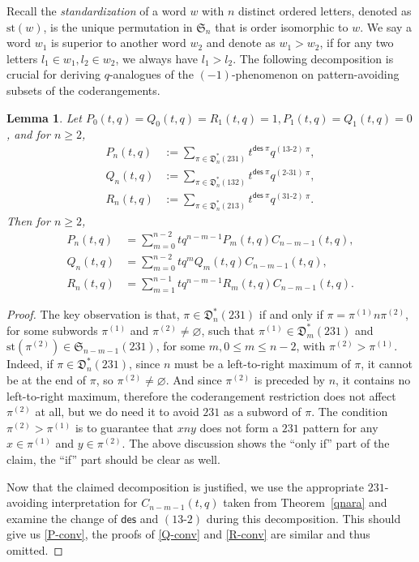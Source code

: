 \documentclass[12pt,reqno]{amsart}
\numberwithin{equation}{section}
\theoremstyle{plain}
\newtheorem{lemma}[theorem]{Lemma}
\theoremstyle{definition}
\def\S{\mathfrak{S}}
\def\D{\mathfrak{D}}
\def\des{\mathsf{des}}
\def\cab{31\text{-}2}
\def\bca{2\text{-}31}
\def\acb{13\text{-}2}
\def\st{\textrm{st}}
\begin{document}
Recall the {\em standardization} of a word $w$ with $n$ distinct ordered letters, denoted as $\st(w)$, is the unique permutation in $\S_n$ that is order isomorphic to $w$. We say a word $w_1$ is superior to another word $w_2$ and denote as $w_1>w_2$, if for any two letters $l_1\in w_1, l_2\in w_2$, we always have $l_1>l_2$. The following decomposition is crucial for deriving $q$-analogues of the $(-1)$-phenomenon on pattern-avoiding subsets of the coderangements.
\begin{lemma}\label{c-a-b decompose}
Let $P_0(t,q)=Q_0(t,q)=R_1(t,q)=1, P_1(t,q)=Q_1(t,q)=0$, and for $n\ge 2$,
\begin{align*}
P_n(t,q)&:=\sum_{\pi\in\D^*_n(231)}t^{\des\:\pi}q^{(\acb)\:\pi},\\
Q_n(t,q)&:=\sum_{\pi\in\D^*_n(132)}t^{\des\:\pi}q^{(\bca)\:\pi},\\
R_n(t,q)&:=\sum_{\pi\in\D^*_n(213)}t^{\des\:\pi}q^{(\cab)\:\pi}.
\end{align*}
Then for $n\ge 2$,
\begin{align}\label{P-conv}
P_n(t,q) &= \sum_{m=0}^{n-2}tq^{n-m-1}P_m(t,q)C_{n-m-1}(t,q),\\
Q_n(t,q) &= \sum_{m=0}^{n-2}tq^{m}Q_m(t,q)C_{n-m-1}(t,q),\label{Q-conv}\\
R_n(t,q) &= \sum_{m=1}^{n-1}tq^{n-m-1}R_m(t,q)C_{n-m-1}(t,q).\label{R-conv}
\end{align}
\end{lemma}
\begin{proof}
The key observation is that, $\pi\in\D^*_n(231)$ if and only if $\pi=\pi^{(1)}n\pi^{(2)}$, for some subwords $\pi^{(1)}$ and $\pi^{(2)}\neq\varnothing$, such that $\pi^{(1)}\in\D^*_m(231)$ and $\st(\pi^{(2)})\in\S_{n-m-1}(231)$, for some $m, 0\le m\le n-2$, with $\pi^{(2)}>\pi^{(1)}$. Indeed, if $\pi\in\D^*_n(231)$, since $n$ must be a left-to-right maximum of $\pi$, it cannot be at the end of $\pi$, so $\pi^{(2)}\neq\varnothing$. And since $\pi^{(2)}$ is preceded by $n$, it contains no left-to-right maximum, therefore the coderangement restriction does not affect $\pi^{(2)}$ at all, but we do need it to avoid $231$ as a subword of $\pi$. The condition $\pi^{(2)}>\pi^{(1)}$ is to guarantee that $xny$ does not form a $231$ pattern for any $x\in\pi^{(1)}$ and $y\in\pi^{(2)}$. The above discussion shows the ``only if'' part of the claim, the ``if'' part should be clear as well.

Now that the claimed decomposition is justified, we use the appropriate $231$-avoiding interpretation for $C_{n-m-1}(t,q)$ taken from Theorem~\ref{qnara} and examine the change of $\des$ and $(\acb)$ during this decomposition. This should give us \eqref{P-conv}, the proofs of \eqref{Q-conv} and \eqref{R-conv} are similar and thus omitted.
\end{proof}
\end{document}
